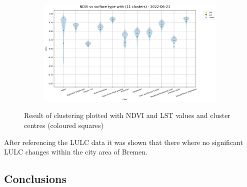 \documentclass[12pt,a4paper, english,twoside]{article}
\begin{document}
\begin{figure}[!p]
\begin{subfigure}[b]{\textwidth}
         \label{fig:ndviclass01}
     \end{subfigure}
     \begin{subfigure}[b]{\textwidth}
         \centering
         \includegraphics[width=\textwidth]{img/NDVI vs surface type with (11 clusters) - 2022-06-21.png}
         \label{fig:ndviclass02}
     \end{subfigure}
          \caption{Result of clustering plotted with \gls{NDVI} and \gls{LST} values and cluster centres (coloured squares)\label{fig:ndvilstclusters}}
        \end{figure}
   


      After referencing the LULC data it was shown that there where no significant LULC changes within the city area of Bremen.  
      
 \subsection{Conclusions}
\end{document}
